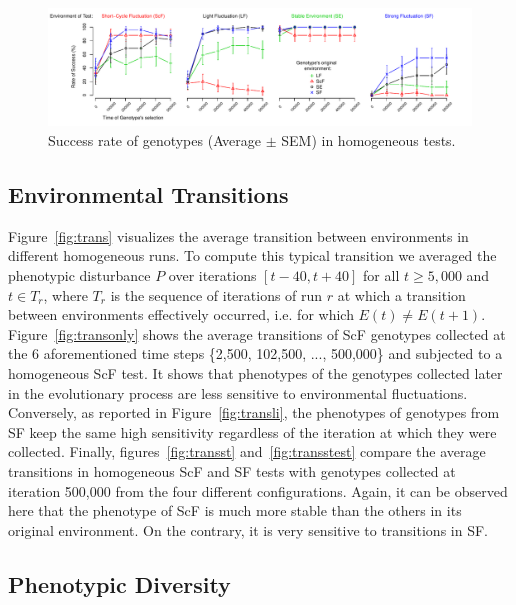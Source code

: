 \begin{figure}[t]
\centering
\includegraphics[width=2\columnwidth]{img/testSurvivingRates}
\caption{Success rate of genotypes (Average $\pm$ SEM) in homogeneous tests.}
\label{fig:survrate}
\end{figure}

\subsection{Environmental Transitions}

Figure~\ref{fig:trans} visualizes the average transition between environments in different homogeneous runs. To compute this typical transition we averaged the phenotypic disturbance $P$ over iterations $[t-40, t+40]$ for all $t \ge 5,000$ and $t \in T_r$, where $T_r$ is the sequence of iterations of run $r$ at which a transition between environments effectively occurred, i.e. for which $E(t) \ne E(t+1)$. Figure~\ref{fig:transonly} shows the average transitions of ScF genotypes collected at the 6 aforementioned time steps \{2,500, 102,500, ..., 500,000\} and subjected to a homogeneous ScF test. It shows that phenotypes of the genotypes collected later in the evolutionary process are less sensitive to environmental fluctuations. Conversely, as reported in Figure~\ref{fig:transli}, the phenotypes of genotypes from SF keep the same high sensitivity regardless of the iteration at which they were collected. Finally, figures~\ref{fig:transst} and~\ref{fig:transstest} compare the average transitions in homogeneous ScF and SF tests with genotypes collected at iteration 500,000 from the four different configurations. Again, it can be observed here that the phenotype of ScF is much more stable than the others in its original environment. On the contrary, it is very sensitive to transitions in SF.

\subsection{Phenotypic Diversity} 

